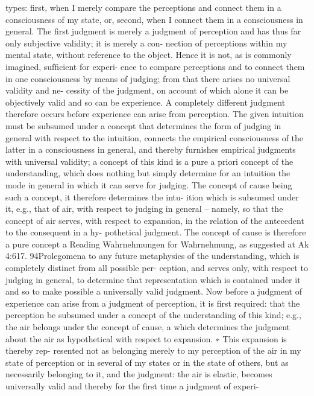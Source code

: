 types: ﬁrst, when I merely compare the perceptions and connect them
in a consciousness of my state, or, second, when I connect them in a
consciousness in general. The ﬁrst judgment is merely a judgment of
perception and has thus far only subjective validity; it is merely a con-
nection of perceptions within my mental state, without reference to the
object. Hence it is not, as is commonly imagined, sufﬁcient for experi-
ence to compare perceptions and to connect them in one consciousness
by means of judging; from that there arises no universal validity and ne-
cessity of the judgment, on account of which alone it can be objectively
valid and so can be experience.
A completely different judgment therefore occurs before experience
can arise from perception. The given intuition must be subsumed under
a concept that determines the form of judging in general with respect
to the intuition, connects the empirical consciousness of the latter in
a consciousness in general, and thereby furnishes empirical judgments
with universal validity; a concept of this kind is a pure a priori concept
of the understanding, which does nothing but simply determine for an
intuition the mode in general in which it can serve for judging. The
concept of cause being such a concept, it therefore determines the intu-
ition which is subsumed under it, e.g., that of air, with respect to judging
in general – namely, so that the concept of air serves, with respect to
expansion, in the relation of the antecedent to the consequent in a hy-
pothetical judgment. The concept of cause is therefore a pure concept
a
Reading Wahrnehmungen for Wahrnehmung, as suggested at Ak 4:617.
94Prolegomena to any future metaphysics
of the understanding, which is completely distinct from all possible per-
ception, and serves only, with respect to judging in general, to determine
that representation which is contained under it and so to make possible
a universally valid judgment.
Now before a judgment of experience can arise from a judgment of
perception, it is ﬁrst required: that the perception be subsumed under
a concept of the understanding of this kind; e.g., the air belongs under
the concept of cause, a which determines the judgment about the air as
hypothetical with respect to expansion. ∗ This expansion is thereby rep-
resented not as belonging merely to my perception of the air in my state
of perception or in several of my states or in the state of others, but as
necessarily belonging to it, and the judgment: the air is elastic, becomes
universally valid and thereby for the ﬁrst time a judgment of experi-
